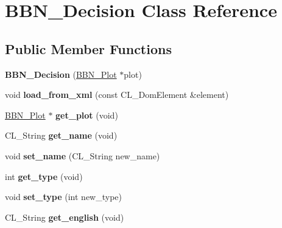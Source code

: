 \hypertarget{classBBN__Decision}{
\section{BBN\_\-Decision Class Reference}
\label{classBBN__Decision}
}
\subsection*{Public Member Functions}
\begin{DoxyCompactItemize}
\item 
\hypertarget{classBBN__Decision_ac249b64693cb21aa5960e822d200b29d}{
{\bfseries BBN\_\-Decision} (\hyperlink{classBBN__Plot}{BBN\_\-Plot} $\ast$plot)}
\label{classBBN__Decision_ac249b64693cb21aa5960e822d200b29d}

\item 
\hypertarget{classBBN__Decision_aa459062927a21ece7c9d63a311500513}{
void {\bfseries load\_\-from\_\-xml} (const CL\_\-DomElement \&element)}
\label{classBBN__Decision_aa459062927a21ece7c9d63a311500513}

\item 
\hypertarget{classBBN__Decision_a18c2870c05eda049b0caf354512cdbbd}{
\hyperlink{classBBN__Plot}{BBN\_\-Plot} $\ast$ {\bfseries get\_\-plot} (void)}
\label{classBBN__Decision_a18c2870c05eda049b0caf354512cdbbd}

\item 
\hypertarget{classBBN__Decision_a358b90a6923f6a0456935a7968a17e1f}{
CL\_\-String {\bfseries get\_\-name} (void)}
\label{classBBN__Decision_a358b90a6923f6a0456935a7968a17e1f}

\item 
\hypertarget{classBBN__Decision_a150d7518524c59bbf45672208469d87e}{
void {\bfseries set\_\-name} (CL\_\-String new\_\-name)}
\label{classBBN__Decision_a150d7518524c59bbf45672208469d87e}

\item 
\hypertarget{classBBN__Decision_a72e419fe1b042ec30bdcec4cb1f64a5a}{
int {\bfseries get\_\-type} (void)}
\label{classBBN__Decision_a72e419fe1b042ec30bdcec4cb1f64a5a}

\item 
\hypertarget{classBBN__Decision_a0fe840d6635329d3200be0d997f83225}{
void {\bfseries set\_\-type} (int new\_\-type)}
\label{classBBN__Decision_a0fe840d6635329d3200be0d997f83225}

\item 
\hypertarget{classBBN__Decision_a828ffd2a68259f18882efa7848d3628a}{
CL\_\-String {\bfseries get\_\-english} (void)}
\label{classBBN__Decision_a828ffd2a68259f18882efa7848d3628a}


\end{DoxyCompactItemize}
